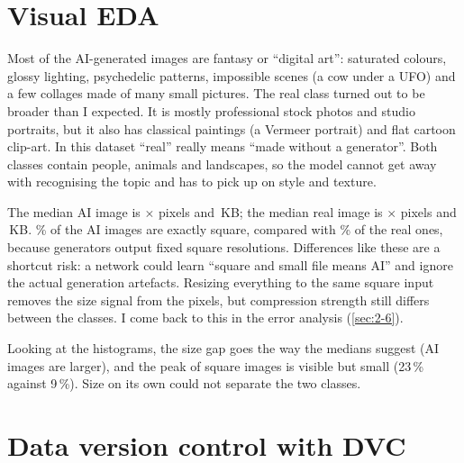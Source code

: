 \section{Visual EDA}
Most of the AI-generated images are fantasy or ``digital art'': saturated colours, glossy
lighting, psychedelic patterns, impossible scenes (a cow under a UFO) and a few collages made of
many small pictures. The real class turned out to be broader than I expected. It is mostly
professional stock photos and studio portraits, but it also has classical paintings (a Vermeer
portrait) and flat cartoon clip-art. In this dataset ``real'' really means ``made without a
generator''. Both classes contain people, animals and landscapes, so the model cannot get away with
recognising the topic and has to pick up on style and texture.

The median AI image is \vgMedWAI{}$\times$\vgMedHAI{} pixels and \vgMedKBAI{}\,KB; the median
real image is \vgMedWReal{}$\times$\vgMedHReal{} pixels and \vgMedKBReal{}\,KB. \vgSquarePctAI{}\%
of the AI images are exactly square, compared with \vgSquarePctReal{}\% of the real ones, because
generators output fixed square resolutions. Differences like these are a shortcut risk: a network
could learn ``square and small file means AI'' and ignore the actual generation artefacts. Resizing
everything to the same square input removes the size signal from the pixels, but compression
strength still differs between the classes. I come back to this in the error analysis
(\cref{sec:2-6}).

Looking at the histograms, the size gap goes the way the medians suggest (AI images are larger),
and the peak of square images is visible but small (23\,\% against 9\,\%). Size on its own could
not separate the two classes.

\section{Data version control with DVC}
